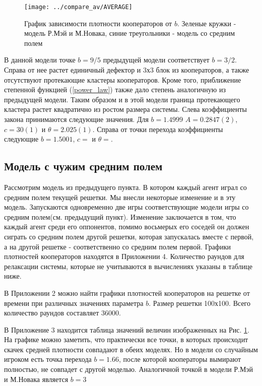 \documentclass[a4paper]{article}
\begin{document}
	\begin{figure}[H]
			\centering
			\texttt{[image: ../compare\_av/AVERAGE]}
			\caption{График зависимости плотности кооператоров от $b$. Зеленые кружки - модель Р.Мэй и М.Новака, синие треугольники - модель со средним полем}
			\label{average}
	\end{figure}
	
	\par В данной модели точке $b=9/5$ предыдущей модели соответствует $b=3/2$. Справа от нее растет единичный дефектор и 3х3 блок из кооператоров, а также отсутствуют протекающие кластеры кооператоров. Кроме того, приближение степенной функцией (\ref{power_law}) также дало степень аналогичную из предыдущей модели. Таким образом и в этой модели граница протекающего кластера растет квадратично из ростом размера системы. Слева коэффициенты закона принимаются следующие значения. Для $b=1.4999$ $A=0.2847(2)$,
	$c=30(1)$ и $\theta=2.025(1)$. Справа от точки перехода коэффициенты следующие
	$b=1.5001$, $c= $ и $\theta= $.
	
	
	\subsection{Модель с чужим средним полем}
	
	\par Рассмотрим модель из предыдущего пункта. В котором каждый агент играл со средним полем текущей решетки. Мы внесли некоторые изменение и в эту модель. Запускаются одновременно две игры соответствующие модели игры со средним полем(см. предыдущий пункт). Изменение заключается в том, что каждый агент среди его оппонентов, помимо восьмерых его соседей он должен сиграть со средним полем другой решетки, которая запускалась вместе с первой, а на другой решетке - соответственно со средним полем первой. Графики плотностей кооператоров находятся в Приложении 4. Количество раундов для релаксации системы, которые не учитываются в вычислениях указаны в таблице ниже.
	
	В Приложении 2 можно найти графики плотностей кооператоров на решетке от времени при различных значениях параметра $b$. Размер решетки 100х100. Всего количество раундов составляет 36000.
	
	В Приложение 3 находится таблица значений величин изображенных на Рис. \ref{average}. На графике можно заметить, что практически все точки, в которых происходит скачек средней плотности совпадают в обеих моделях. Но в модели со случайным игроком есть точка перехода $b=1.66$, после которой кооператоры вымирают полностью, не совпадет с другой моделью. Аналогичной точкой в модели Р.Мэй и М.Новака является $b=3$
	
\end{document}

